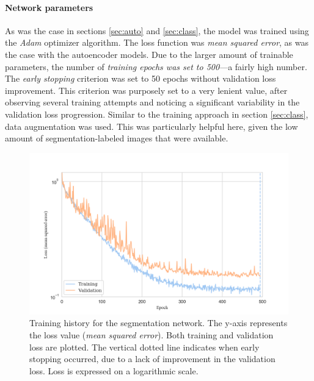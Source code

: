 \paragraph{Network parameters} As was the case in sections \textcolor{blue}{\ref{sec:auto}} and \textcolor{blue}{\ref{sec:class}}, the model was trained using the \textit{Adam} optimizer algorithm. The loss function was \textit{mean squared error}, as was the case with the autoencoder models. Due to the larger amount of trainable parameters, the number of \textit{training epochs was set to 500}---a fairly high number. The \textit{early stopping} criterion was set to 50 epochs without validation loss improvement. This criterion was purposely set to a very lenient value, after observing several training attempts and noticing a significant variability in the validation loss progression. Similar to the training approach in section \textcolor{blue}{\ref{sec:class}}, data augmentation was used. This was particularly helpful here, given the low amount of segmentation-labeled images that were available.

\begin{figure}[!htbp]
  \begin{center}
    \includegraphics[width=\linewidth, keepaspectratio]{images/segm_history}
    \caption{Training history for the segmentation network. The y-axis represents the loss value (\textit{mean squared error}). Both training and validation loss are plotted. The vertical dotted line indicates when early stopping occurred, due to a lack of improvement in the validation loss. Loss is expressed on a logarithmic scale.}
    \label{fig:segm_history}
  \end{center}
\end{figure}

